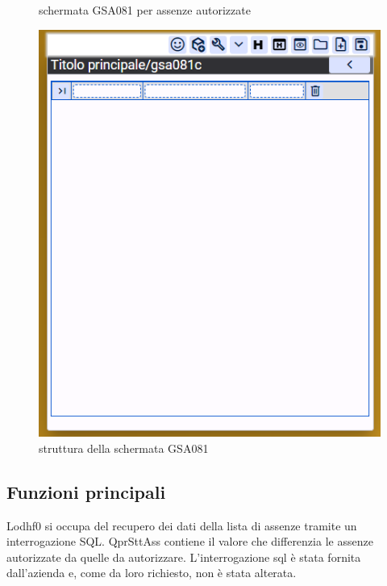 \documentclass[target=bach,aauheader=,style=]{thud}
\begin{document}
\begin{figure}[h]
\begin{minipage}{0.3\textwidth}
        \caption{schermata GSA081 per assenze autorizzate}
    \end{minipage}
    \hfill
    \begin{minipage}{0.3\textwidth}
        \centering
        \includegraphics[width=\linewidth]{screenshot/Struttura_gsa081.png}
        \caption{struttura della schermata GSA081}
    \end{minipage}
\end{figure}

\break
\subsection{Funzioni principali}



Lodhf0 si occupa del recupero dei dati della lista di assenze tramite un interrogazione SQL. 
QprSttAss contiene il valore che differenzia le assenze autorizzate da quelle da autorizzare.
L'interrogazione sql è stata fornita dall'azienda e, come da loro richiesto, non è stata alterata.
\end{document}
